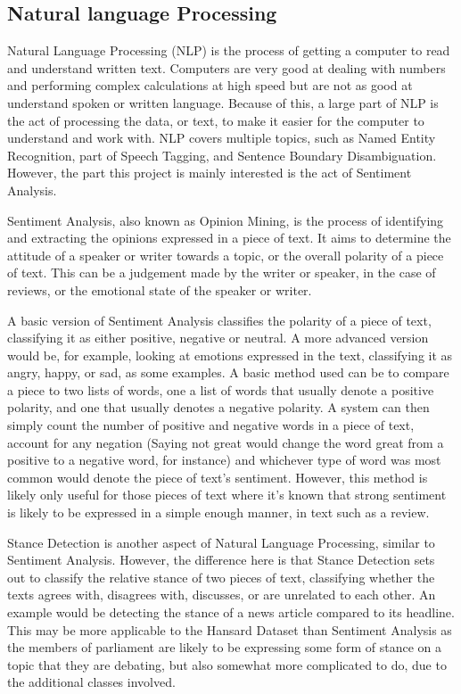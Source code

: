 \subsection{Natural language Processing}
Natural Language Processing (NLP) is the process of getting a computer to read and understand written text. Computers are very good at dealing with numbers and performing complex calculations at high speed but are not as good at understand spoken or written language. Because of this, a large part of NLP is the act of processing the data, or text, to make it easier for the computer to understand and work with. NLP covers multiple topics, such as Named Entity Recognition, part of Speech Tagging, and Sentence Boundary Disambiguation. However, the part this project is mainly interested is the act of Sentiment Analysis.

Sentiment Analysis, also known as Opinion Mining, is the process of identifying and extracting the opinions expressed in a piece of text. It aims to determine the attitude of a speaker or writer towards a topic, or the overall polarity of a piece of text. This can be a judgement made by the writer or speaker, in the case of reviews, or the emotional state of the speaker or writer.

A basic version of Sentiment Analysis classifies the polarity of a piece of text, classifying it as either positive, negative or neutral. A more advanced version would be, for example, looking at emotions expressed in the text, classifying it as angry, happy, or sad, as some examples. A basic method used can be to compare a piece to two lists of words, one a list of words that usually denote a positive polarity, and one that usually denotes a negative polarity. A system can then simply count the number of positive and negative words in a piece of text, account for any negation (Saying not great would change the word great from a positive to a negative word, for instance) and whichever type of word was most common would denote the piece of text’s sentiment. However, this method is likely only useful for those pieces of text where it’s known that strong sentiment is likely to be expressed in a simple enough manner, in text such as a review.  

Stance Detection is another aspect of Natural Language Processing, similar to Sentiment Analysis. However, the difference here is that Stance Detection sets out to classify the relative stance of two pieces of text, classifying whether the texts agrees with, disagrees with, discusses, or are unrelated to each other. An example would be detecting the stance of a news article compared to its headline. This may be more applicable to the Hansard Dataset than Sentiment Analysis as the members of parliament are likely to be expressing some form of stance on a topic that they are debating, but also somewhat more complicated to do, due to the additional classes involved.

